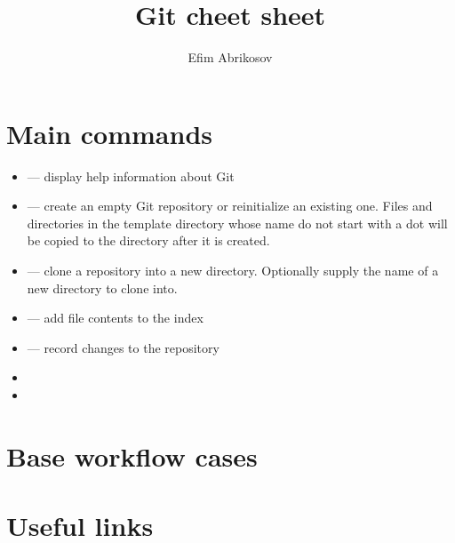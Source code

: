 \documentclass[12pt]{article}
\begin{document}
\title{Git cheet sheet}
\author{Efim Abrikosov}
\maketitle


\section{Main commands}
\begin{itemize}
  \item {} --- display help information about Git
  \item {} --- create an empty Git repository or reinitialize an existing one. Files and directories in the template directory whose name do not start with a dot will be copied to the directory after it is created.
  \item {} --- clone a repository into a new directory. Optionally supply the name of a new directory to clone into.
  \item {} --- add file contents to the index
  \item {} --- record changes to the repository
  \item {}
  \item {}
\end{itemize}




\section{Base workflow cases}


\section{Useful links}
\end{document}
